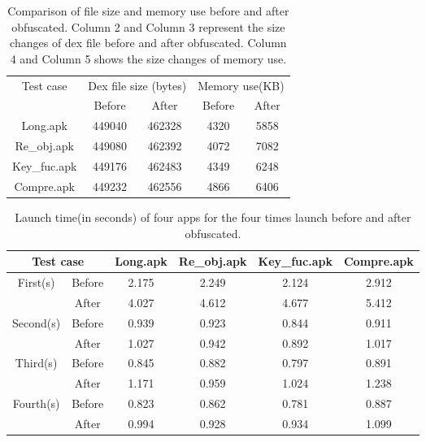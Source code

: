 \begin{table}[htbp]
  \centering
  \begin{tabular}{c c c c c}
  \toprule
  \multirow{2}{*}{Test case} & \multicolumn{2}{c}{Dex file size (bytes)} & \multicolumn{2}{c}{Memory use(KB)}\\
  \cline{2-5}
  \cmidrule{2-5}

  & Before & After &  Before & After\\
  \hline

  Long.apk & 449040 & 462328 & 4320 & 5858\\
   \rowcolor{mygray}


  Re\_obj.apk & 449080 & 462392 & 4072 & 7082\\


  Key\_fuc.apk & 449176 & 462483 & 4349 & 6248\\

\rowcolor{mygray}
  Compre.apk & 449232 & 462556 & 4866 & 6406\\
  \bottomrule
  \end{tabular}
  \caption{Comparison of file size and memory use before and after obfuscated. Column 2 and Column 3 represent the size changes of dex file before and after obfuscated. Column 4 and Column 5 shows the size changes of memory use.}\label{tab:Table 3}
\end{table}

\begin{table}[htbp]
  \centering
  \begin{tabular}{c c c c c c}
  \toprule

  \multicolumn{2}{c}{Test case} & Long.apk & Re\_obj.apk & Key\_fuc.apk & Compre.apk\\
  \hline
   \hline
  \multirow{2}{*}{First(s)} & Before & 2.175 & 2.249 & 2.124 & 2.912\\
  & After & 4.027 & 4.612 & 4.677 & 5.412\\
  \hline


  \multirow{2}{*}{Second(s)} & Before & 0.939 & 0.923 & 0.844 & 0.911\\
  & After & 1.027 & 0.942 & 0.892 & 1.017\\
  \hline

  \multirow{2}{*}{Third(s)} & Before & 0.845 & 0.882 & 0.797 & 0.891\\
  & After & 1.171 & 0.959 & 1.024 & 1.238\\
  \hline

  \multirow{2}{*}{Fourth(s)} & Before & 0.823 & 0.862 & 0.781 & 0.887\\
  & After & 0.994 & 0.928 & 0.934 & 1.099\\

  \bottomrule
  \end{tabular}
   \caption{Launch time(in seconds) of four apps for the four times launch before and after obfuscated.}\label{tab:Table 4}
\end{table}